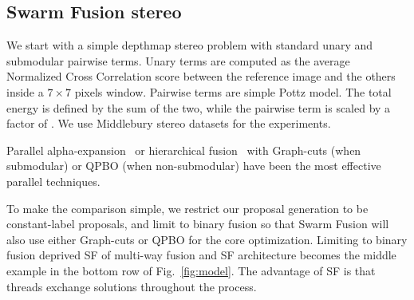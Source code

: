 \subsection{Swarm Fusion stereo}
We start with a simple depthmap stereo problem with standard unary and
submodular pairwise terms. Unary terms are computed as the average
Normalized Cross Correlation score between the reference image and the
others inside a $7\times 7$ pixels window. Pairwise terms are simple
Pottz model. The total energy is defined by the sum of the two, while
the pairwise term is scaled by a factor of .
%
We use Middlebury stereo datasets for the experiments.


\noindent
Parallel alpha-expansion~\cite{delong} or hierarchical
fusion~\cite{delong,olga} with Graph-cuts (when submodular) or QPBO
(when non-submodular) have been the most effective parallel techniques.
%


\noindent
To make the comparison simple, we restrict our proposal generation to be
constant-label proposals, and limit to binary fusion so that Swarm
Fusion will also use either Graph-cuts or QPBO for the core
optimization. Limiting to binary fusion deprived SF of multi-way fusion
and SF architecture becomes the middle example in the bottom row of
Fig.~\ref{fig:model}.
%
The advantage of SF is that threads exchange solutions throughout the
process.
